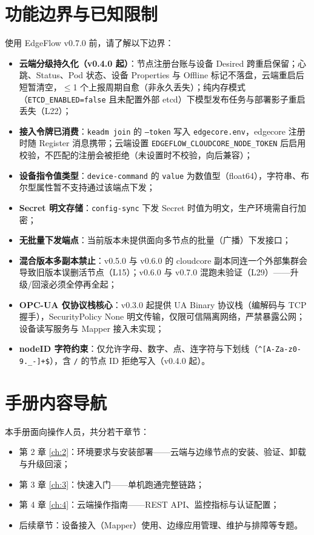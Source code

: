 \section{功能边界与已知限制}

使用 EdgeFlow v0.7.0 前，请了解以下边界：

\begin{itemize}
  \item \textbf{云端分级持久化（v0.4.0 起）}：节点注册台账与设备 Desired 跨重启保留；心跳、Status、Pod 状态、设备 Properties 与 Offline 标记不落盘，云端重启后短暂清空，$\le$1 个上报周期自愈（非永久丢失）；纯内存模式（\texttt{ETCD\_ENABLED=false} 且未配置外部 etcd）下模型发布任务与部署影子重启丢失（L22）；
  \item \textbf{接入令牌已消费}：\texttt{keadm join} 的 \texttt{--token} 写入 \texttt{edgecore.env}，edgecore 注册时随 Register 消息携带；云端设置 \texttt{EDGEFLOW\_CLOUDCORE\_NODE\_TOKEN} 后启用校验，不匹配的注册会被拒绝（未设置时不校验，向后兼容）；
  \item \textbf{设备指令值类型}：\texttt{device-command} 的 \texttt{value} 为数值型（float64），字符串、布尔型属性暂不支持通过该端点下发；
  \item \textbf{Secret 明文存储}：\texttt{config-sync} 下发 Secret 时值为明文，生产环境需自行加密；
  \item \textbf{无批量下发端点}：当前版本未提供面向多节点的批量（广播）下发接口；
  \item \textbf{混合版本多副本禁止}：v0.5.0 与 v0.6.0 的 cloudcore 副本同连一个外部集群会导致旧版本误删活节点（L15）；v0.6.0 与 v0.7.0 混跑未验证（L29）——升级/回滚必须全停再全起；
  \item \textbf{OPC-UA 仅协议栈核心}：v0.3.0 起提供 UA Binary 协议栈（编解码与 TCP 握手），SecurityPolicy None 明文传输，仅限可信隔离网络，严禁暴露公网；设备读写服务与 Mapper 接入未实现；
  \item \textbf{nodeID 字符约束}：仅允许字母、数字、点、连字符与下划线（\texttt{\textasciicircum{}[A-Za-z0-9.\_-]+\$}），含 \texttt{/} 的节点 ID 拒绝写入（v0.4.0 起）。
\end{itemize}

\section{手册内容导航}

本手册面向操作人员，共分若干章节：

\begin{itemize}
  \item 第 2 章 \autoref{ch:2}：环境要求与安装部署——云端与边缘节点的安装、验证、卸载与升级回滚；
  \item 第 3 章 \autoref{ch:3}：快速入门——单机跑通完整链路；
  \item 第 4 章 \autoref{ch:4}：云端操作指南——REST API、监控指标与认证配置；
  \item 后续章节：设备接入（Mapper）使用、边缘应用管理、维护与排障等专题。
\end{itemize}
